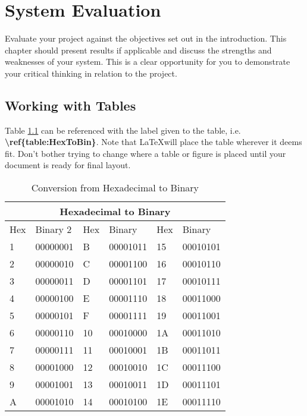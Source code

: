 \chapter{System Evaluation}
Evaluate your project against the objectives set out in the introduction.
This chapter should present results if applicable and discuss the strengths and weaknesses of your system. This is a clear opportunity for you to demonstrate your critical thinking in relation to the project. 


\section{Working with Tables}
Table \ref{table:HexToBin} can be referenced with the label given to the table, i.e. \textbf{\textbackslash{}ref\{table:HexToBin\}}. Note that \LaTeX will place the table wherever it deems fit. Don't bother trying to change where a table or figure is placed until your document is ready for final layout.

\begin{table}
    \begin{tabular}{p{2cm}|p{2cm}|p{2cm}|p{2cm}|p{2cm}|p{2cm}}
        \hline
        \multicolumn{6}{|c|}{Hexadecimal to Binary} \\
        \hline
        Hex & Binary 2 & Hex & Binary & Hex & Binary\\
        \hline
        \hline
        1 & 00000001 & B & 00001011 & 15 & 00010101 \\
        2 & 00000010 & C & 00001100 & 16 & 00010110 \\
        3 & 00000011 & D & 00001101 & 17 & 00010111 \\
        4 & 00000100 & E & 00001110 & 18 & 00011000 \\
        5 & 00000101 & F & 00001111 & 19 & 00011001 \\
        6 & 00000110 & 10 & 00010000 & 1A & 00011010 \\
        7 & 00000111 & 11 & 00010001 & 1B & 00011011 \\
        8 & 00001000 & 12 & 00010010 & 1C & 00011100 \\
        9 & 00001001 & 13 & 00010011 & 1D & 00011101 \\
        A & 00001010 & 14 & 00010100 & 1E & 00011110 \\
        \hline
    \end{tabular}
    \caption{Conversion from Hexadecimal to Binary}
    \label{table:HexToBin}
\end{table}